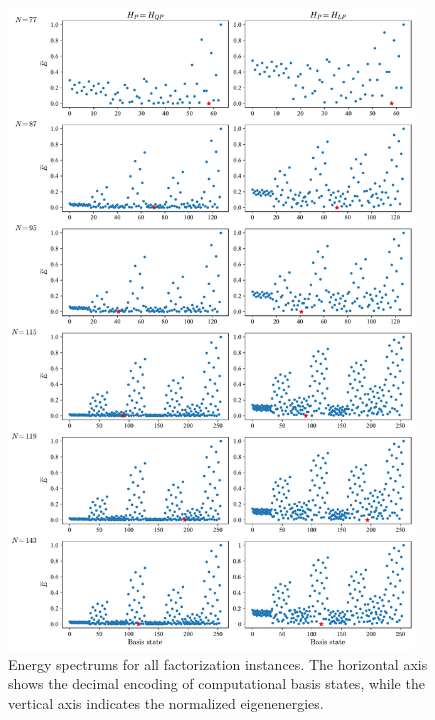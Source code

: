\begin{figure}[H]
    \centering
    \includegraphics[width=0.96\textwidth]{06-appendix/figs/energy_spectrums_all2.pdf}
    \caption{Energy spectrums for all factorization instances. The horizontal axis shows the decimal encoding of computational basis states, while the vertical axis indicates the normalized eigenenergies.}
    \label{fig:energy_spectrums_all}
\end{figure}